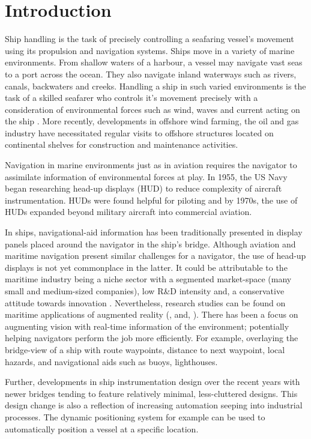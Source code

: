 \chapter{Introduction}

Ship handling is the task of precisely controlling a seafaring vessel’s movement using its propulsion and navigation systems. Ships move in a variety of marine environments. From shallow waters of a harbour, a vessel may  navigate vast seas to a port across the ocean. They also navigate inland waterways such as rivers, canals, backwaters and creeks. Handling a ship in such varied environments is the task of a skilled seafarer who controls it's movement precisely with a consideration of environmental forces such as wind, waves and current acting on the ship \parencite{wiki:seamanship}. More recently, developments in offshore wind farming, the oil and gas industry have necessitated regular visits to offshore structures located on continental shelves for construction and maintenance activities. 

Navigation in marine environments just as in aviation requires the navigator to assimilate information of environmental forces at play. In 1955, the US Navy began researching head-up displays (HUD) to reduce complexity of aircraft instrumentation. HUDs were found helpful for piloting and by 1970s, the use of HUDs expanded beyond military aircraft into commercial aviation.

In ships, navigational-aid information has been traditionally presented in display panels placed around the navigator in the ship's bridge. Although aviation and maritime navigation present similar challenges for a navigator, the use of head-up displays is not yet commonplace in the latter. It could be attributable to the maritime industry being a niche sector with a segmented market-space (many small and medium-sized companies), low R\&D intensity and, a conservative attitude towards innovation \parencite{von2014maritime}. Nevertheless, research studies can be found on maritime applications of augmented reality (\cite{hugues2010experimental}, \cite{vasiljevic2011augmented} and, \cite{von2014maritime}). There has been a focus on augmenting vision with real-time information of the environment; potentially helping navigators perform the job more efficiently. For example, overlaying the bridge-view of a ship with route waypoints, distance to next waypoint, local hazards, and navigational aids such as buoys, lighthouses. 

Further, developments in ship instrumentation design over the recent years with newer bridges tending to feature relatively minimal, less-cluttered designs. This design change is also a reflection of increasing automation seeping into industrial processes. The dynamic positioning system for example can be used to automatically position a vessel at a specific location.

